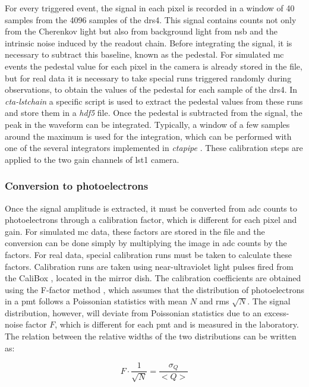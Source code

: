 \documentclass[main.tex]{subfiles}
\begin{document}
For every triggered event, the signal in each pixel is recorded in a window of 40 samples from the 4096 samples of the \gls{drs4}. This signal contains counts not only from the Cherenkov light but also from background light from \gls{nsb} and the intrinsic noise induced by the readout chain. Before integrating the signal, it is necessary to subtract this baseline, known as the pedestal. For simulated \gls{mc} events the pedestal value for each pixel in the camera is already stored in the file, but for real data it is necessary to take special runs triggered randomly during observations, to obtain the values of the pedestal for each sample of the \gls{drs4}. In \textit{cta-lstchain} a specific script is used to extract the pedestal values from these runs and store them in a \textit{hdf5} file.
Once the pedestal is subtracted from the signal, the peak in the waveform can be integrated. Typically, a window of a few samples around the maximum is used for the integration, which can be performed with one of the several integrators implemented in \textit{ctapipe} \cite{ctapipeextractors}. These calibration steps are applied to the two gain channels of \gls{lst}1 camera.

\subsubsection{Conversion to photoelectrons}

Once the signal amplitude is extracted, it must be converted from \gls{adc} counts to photoelectrons through a calibration factor, which is different for each pixel and gain. For simulated \gls{mc} data, these factors are stored in the file and the conversion can be done simply by multiplying the image in \gls{adc} counts by the factors. For real data, special calibration runs must be taken to calculate these factors. Calibration runs are taken using near-ultraviolet light pulses fired from the CaliBox \cite{2015CaliBox}, \cite{2019CaliBox} located in the mirror dish. The calibration coefficients are obtained using the F-factor method \cite{1997calibrationPMT}, which assumes that the distribution of photoelectrons in a \gls{pmt} follows a Poissonian statistics with mean $N$ and \gls{rms} $\sqrt{N}$. The signal distribution, however, will deviate from Poissonian statistics due to an excess-noise factor $F$, which is different for each \gls{pmt} and is measured in the laboratory. The relation between the relative widths of the two distributions can be written as:

\begin{equation}
  F \cdot \frac{1}{\sqrt{N}} = \frac{\sigma_{Q}}{<Q>}
  \label{eq:ffactor}
\end{equation}
\end{document}
